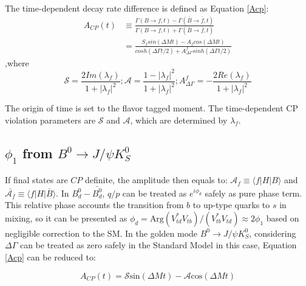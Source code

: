 The time-dependent decay rate difference is defined as Equation \ref{Acp}:
\begin{equation}\label{Acp}
\begin{split}
A_{CP}(t)&\equiv \frac{\Gamma(B\to f,t)-\Gamma(\bar{B}\to \bar{f},t)}{\Gamma(B\to f,t)+\Gamma(\bar{B}\to \bar{f},t)}\\
&=\frac{S_f sin(\Delta{M}t)-A_fcos(\Delta{M}t)}
{cosh(\Delta \Gamma t/2)+A^f_{\Delta \Gamma}sinh(\Delta \Gamma t/2)}
\end{split}
\end{equation},where
\begin{equation}\label{cp-parameters}
\mathcal{S}=\frac{2Im(\lambda_f)}{1+|\lambda_f|^2};\mathcal{A}=\frac{1-|\lambda_f|^2}{1+|\lambda_f|^2};A^f_{\Delta \Gamma}=-\frac{2Re(\lambda_f)}{1+|\lambda_f|^2}
\end{equation}

 The origin of time is set to the flavor tagged moment.
 The time-dependent CP violation parameters are $\mathcal{S}$ and $\mathcal{A}$, which are determined by $\lambda_f$.



\subsection{$\phi_1$  from $B^0 \to J/\psi K^0_S$}
If final states are $CP$ definite, the amplitude then equals to: $\mathcal{A}_f \equiv \langle f|H|B\rangle$ and $\bar{\mathcal{A}_f} \equiv \langle f|H|\bar{B}\rangle$. In $B_d^0-\bar{B_d^0}$, $q/p$ can be treated as $e^{i\phi_d}$ safely as pure phase term. This relative phase accounts the transition from $b$ to up-type quarks to $s$ in mixing, so it can be presented as $\phi_d = \text{Arg}(V^*_{td}V_{tb})/(V^*_{tb}V_{td}) \approx 2\phi_1 $ based on negligible correction to the SM. In the golden mode $B^0 \to J/\psi K^0_S$, considering $\Delta \Gamma$ can be treated as zero safely in the Standard Model\cite{dighe2001width} in this case, Equation \ref{Acp} can be reduced to:

\begin{equation}
	A_{CP}(t)=\mathcal{S} \text{sin}(\Delta{M}t)- \mathcal{A}\text{cos}(\Delta{M}t)
\end{equation}

